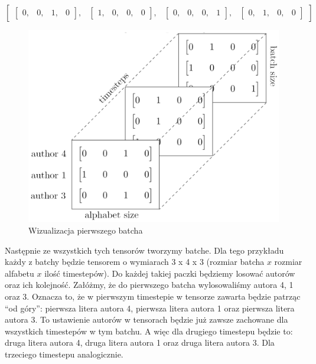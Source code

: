 $
\begin{bmatrix} \begin{bmatrix} 0, & 0, & 1, & 0\end{bmatrix},  & \begin{bmatrix} 1, & 0, & 0, & 0\end{bmatrix}, & \begin{bmatrix} 0, & 0, & 0, & 1\end{bmatrix}, & \begin{bmatrix} 0, & 1, & 0, & 0\end{bmatrix} \end{bmatrix}
$



\begin{figure}
\vspace{-4mm}
\includegraphics[width=\linewidth]{./images/batch.png}
\caption{Wizualizacja pierwszego batcha}
\label{fig:test2}
\vspace{-4mm}
\end{figure}
 
Następnie ze wszystkich tych tensorów tworzymy batche.
Dla tego przykładu każdy z batchy będzie tensorem o wymiarach 3 x 4 x 3 (rozmiar batcha $x$ rozmiar 
alfabetu $x$ ilość timestepów).
Do każdej takiej paczki będziemy losować autorów oraz ich kolejność. Załóżmy, że do pierwszego batcha
wylosowaliśmy autora 4, 1 oraz 3. Oznacza to, że w pierwszym timestepie w tensorze zawarta będzie 
patrząc ``od góry'': pierwsza litera autora 4, pierwsza litera autora 1 oraz pierwsza litera autora 3.
To ustawienie autorów w tensorach będzie już zawsze zachowane dla wszystkich timestepów w tym batchu. 
A więc dla drugiego timestepu będzie to: druga litera autora 4, druga litera autora 1 oraz druga 
litera autora 3. Dla trzeciego timestepu analogicznie. 

